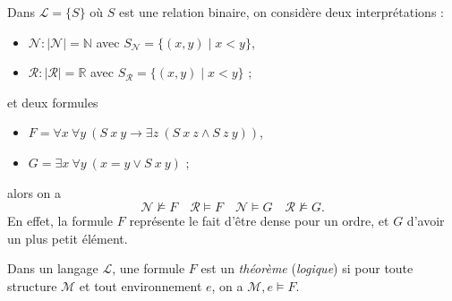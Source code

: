 \documentclass[./main]{subfiles}
\begin{document}
  \begin{exm}
    Dans $\mathcal{L} = \{S\}$ où $S$ est une relation binaire, on considère deux interprétations :
    \begin{itemize}
      \item $\mathcal{N} : |\mathcal{N}| = \mathds{N}$ avec $S_{\mathcal{N}} = \{(x,y)  \mid x < y\}$,
      \item $\mathcal{R} : |\mathcal{R}| = \mathds{R}$ avec $S_{\mathcal{R}} = \{(x,y)  \mid x < y\}$ ;
    \end{itemize}
    et deux formules
    \begin{itemize}
      \item $F = \forall x \: \forall y \: (S\: x \: y \to \exists z\:(S \: x \: z \land S \: z \: y))$,
      \item $G = \exists x \: \forall y \: (x = y \lor S \: x \: y)$ ;
    \end{itemize}
    alors on a 
    \[
    \mathcal{N} \not\models F \quad \mathcal{R} \models F \quad \mathcal{N} \models G \quad \mathcal{R} \not\models G
    .\]
    En effet, la formule $F$ représente le fait d'être dense pour un ordre, et $G$ d'avoir un plus petit élément.
  \end{exm}

  \begin{defn}
    Dans un langage $\mathcal{L}$, une formule $F$ est un \textit{théorème} (\textit{logique}) si pour toute structure $\mathcal{M}$ et tout environnement $e$, on a $\mathcal{M}, e \models F$.
  \end{defn}
\end{document}
